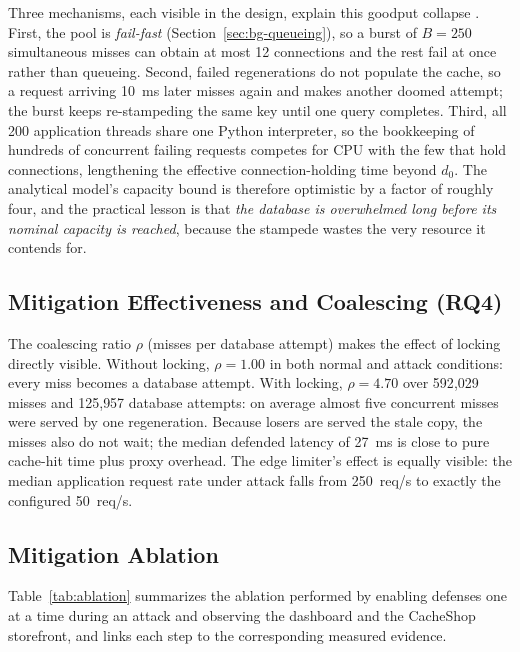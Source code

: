 Three mechanisms, each visible in the design, explain this goodput collapse
\cite{jacobson1988,mogul1997}. First, the pool is \emph{fail-fast}
(Section~\ref{sec:bg-queueing}), so a burst of $B=250$ simultaneous misses can obtain at
most 12 connections and the rest fail at once rather than queueing. Second, failed
regenerations do not populate the cache, so a request arriving 10~ms later misses again
and makes another doomed attempt; the burst keeps re-stampeding the same key until one
query completes. Third, all 200 application threads share one Python interpreter, so
the bookkeeping of hundreds of concurrent failing requests competes for CPU with the
few that hold connections, lengthening the effective connection-holding time beyond
$d_0$. The analytical model's capacity bound is therefore optimistic by a factor of
roughly four, and the practical lesson is that \emph{the database is overwhelmed long
before its nominal capacity is reached}, because the stampede wastes the very
resource it contends for.

\subsection{Mitigation Effectiveness and Coalescing (RQ4)}
\label{sec:mitigation-results}
The coalescing ratio $\rho$ (misses per database attempt) makes the effect of locking
directly visible. Without locking, $\rho=1.00$ in both normal and attack conditions:
every miss becomes a database attempt. With locking, $\rho=4.70$ over 592{,}029 misses
and 125{,}957 database attempts: on average almost five concurrent misses were served
by one regeneration. Because losers are served the stale copy, the misses also do not
wait; the median defended latency of 27~ms is close to pure cache-hit time plus
proxy overhead. The edge limiter's effect is equally visible: the median application
request rate under attack falls from 250~req/s to exactly the configured 50~req/s.

\subsection{Mitigation Ablation}
\label{sec:ablation}
Table~\ref{tab:ablation} summarizes the ablation performed by enabling defenses one at a
time during an attack and observing the dashboard and the CacheShop storefront, and
links each step to the corresponding measured evidence.

